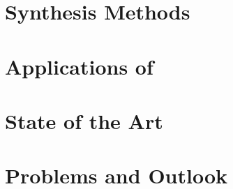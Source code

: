 \documentclass[%
 reprint,
 amsmath,amssymb,
 aps,
pra,
floatfix,
]{revtex4-1}
\begin{document}
\section{\label{sec:synthesis_methods} Synthesis Methods}

\section{\label{sec:mos2_applications} Applications of }

\section{\label{sec:state_of_the_art} State of the Art}

\section{\label{sec:problems_and_outlook} Problems and Outlook}




\end{document}
